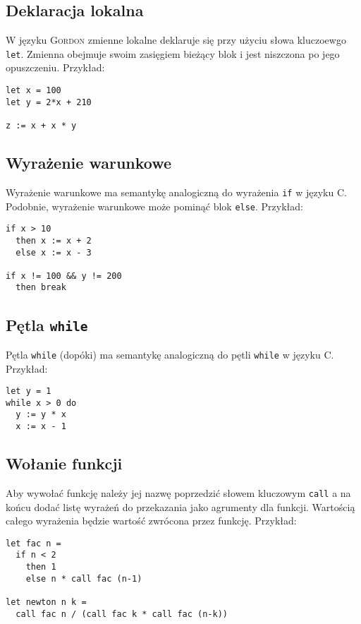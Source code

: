 \documentclass{documentation}
\begin{document}
\subsection{Deklaracja lokalna}
W języku \textsc{Gordon} zmienne lokalne deklaruje się przy użyciu słowa kluczoewgo
\texttt{let}. Zmienna obejmuje swoim zasięgiem bieżący blok i jest niszczona po
jego opuszczeniu. Przykład:

\begin{verbatim}
let x = 100
let y = 2*x + 210

z := x + x * y
\end{verbatim}

\subsection{Wyrażenie warunkowe}
Wyrażenie warunkowe ma semantykę analogiczną do wyrażenia \texttt{if}
w języku \textsc{C}. Podobnie, wyrażenie warunkowe może pominąć blok \texttt{else}.
Przykład:

\begin{verbatim}
if x > 10
  then x := x + 2
  else x := x - 3

if x != 100 && y != 200
  then break
\end{verbatim}

\subsection{Pętla \texttt{while}}
Pętla \texttt{while} (dopóki) ma semantykę analogiczną do pętli \texttt{while} w języku
\textsc{C}. Przykład:

\begin{verbatim}
let y = 1
while x > 0 do
  y := y * x
  x := x - 1
\end{verbatim}

\subsection{Wołanie funkcji}
Aby wywołać funkcję należy jej nazwę poprzedzić słowem kluczowym \texttt{call} a na końcu
dodać listę wyrażeń do przekazania jako agrumenty dla funkcji. Wartością całego wyrażenia
będzie wartość zwrócona przez funkcję.
Przykład:

\begin{verbatim}
let fac n =
  if n < 2
    then 1
    else n * call fac (n-1)

let newton n k =
  call fac n / (call fac k * call fac (n-k))
\end{verbatim}
\end{document}
